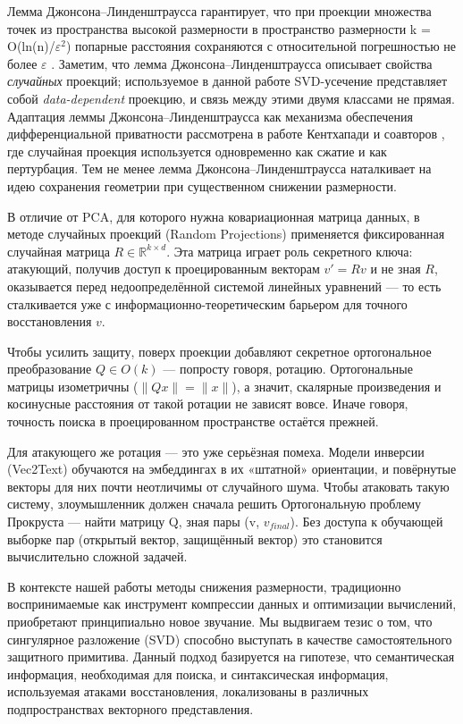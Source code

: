 \documentclass[a4paper, 12pt, oneside, openany]{article}
\begin{document}
Лемма Джонсона--Линденштраусса гарантирует, что при проекции множества точек из пространства высокой размерности в пространство размерности k = O(ln(n)/\(\varepsilon^{2}\)) попарные расстояния сохраняются с относительной погрешностью не более \(\varepsilon\) \cite{ref23}. Заметим, что лемма Джонсона--Линденштраусса описывает свойства \emph{случайных} проекций; используемое в данной работе SVD-усечение представляет собой \emph{data-dependent} проекцию, и связь между этими двумя классами не прямая. Адаптация леммы Джонсона--Линденштраусса как механизма обеспечения дифференциальной приватности рассмотрена в работе Кентхапади и соавторов \cite{ref56}, где случайная проекция используется одновременно как сжатие и как пертурбация. Тем не менее лемма Джонсона--Линденштраусса наталкивает на идею сохранения геометрии при существенном снижении размерности.

В отличие от PCA, для которого нужна ковариационная матрица данных, в методе случайных проекций (Random Projections) применяется фиксированная случайная матрица $R \in \mathbb{R}^{k \times d}$. Эта матрица играет роль секретного ключа: атакующий, получив доступ к проецированным векторам $v' = Rv$ и не зная $R$, оказывается перед недоопределённой системой линейных уравнений — то есть сталкивается уже с информационно-теоретическим барьером для точного восстановления $v$.

Чтобы усилить защиту, поверх проекции добавляют секретное ортогональное преобразование $Q \in O(k)$ — попросту говоря, ротацию. Ортогональные матрицы изометричны ($\|Qx\| = \|x\|$), а значит, скалярные произведения и косинусные расстояния от такой ротации не зависят вовсе. Иначе говоря, точность поиска в проецированном пространстве остаётся прежней.

Для атакующего же ротация — это уже серьёзная помеха. Модели инверсии (Vec2Text) обучаются на эмбеддингах в их «штатной» ориентации, и повёрнутые векторы для них почти неотличимы от случайного шума. Чтобы атаковать такую систему, злоумышленник должен сначала решить Ортогональную проблему Прокруста --- найти матрицу Q, зная пары (v, \(v_{final}\)). Без доступа к обучающей выборке пар (открытый вектор, защищённый вектор) это становится вычислительно сложной задачей.

В контексте нашей работы методы снижения размерности, традиционно воспринимаемые как инструмент компрессии данных и оптимизации вычислений, приобретают принципиально новое звучание. Мы выдвигаем тезис о том, что сингулярное разложение (SVD) способно выступать в качестве самостоятельного защитного примитива. Данный подход базируется на гипотезе, что семантическая информация, необходимая для поиска, и синтаксическая информация, используемая атаками восстановления, локализованы в различных подпространствах векторного представления.
\end{document}
